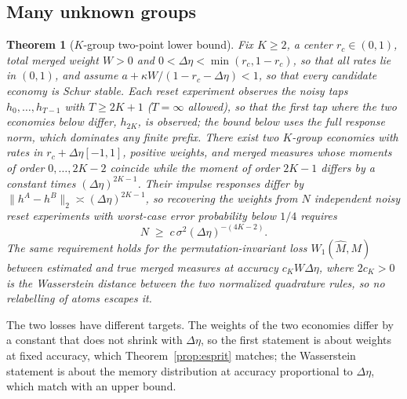 \documentclass[12pt]{article}
\newtheorem{theorem}{Theorem}[section]
\theoremstyle{definition}
\theoremstyle{remark}
\begin{document}
\subsection{Many unknown groups}

\begin{theorem}[$K$-group two-point lower bound]\label{thm:kcohort}
Fix $K\ge2$, a center $r_c\in(0,1)$, total merged weight $W>0$ and $0<\Delta\eta<\min(r_c,1-r_c)$, so that all rates lie in $(0,1)$, and assume $a+\kappa W/(1-r_c-\Delta\eta)<1$, so that every candidate economy is Schur stable. Each reset experiment observes the noisy taps $h_0,\ldots,h_{T-1}$ with $T\ge2K+1$ ($T=\infty$ allowed), so that the first tap where the two economies below differ, $h_{2K}$, is observed; the bound below uses the full response norm, which dominates any finite prefix. There exist two $K$-group economies with rates in $r_c+\Delta\eta[-1,1]$, positive weights, and merged measures whose moments of order $0,\ldots,2K-2$ coincide while the moment of order $2K-1$ differs by a constant times $(\Delta\eta)^{2K-1}$. Their impulse responses differ by $\|h^A-h^B\|_2\asymp(\Delta\eta)^{2K-1}$, so recovering the weights from $N$ independent noisy reset experiments with worst-case error probability below $1/4$ requires
\[
N\;\ge\;c\,\sigma^2(\Delta\eta)^{-(4K-2)} .
\]
The same requirement holds for the permutation-invariant loss $W_1(\hat M,M)$ between estimated and true merged measures at accuracy $c_KW\Delta\eta$, where $2c_K>0$ is the Wasserstein distance between the two normalized quadrature rules, so no relabelling of atoms escapes it.
\end{theorem}

The two losses have different targets. The weights of the two economies differ by a constant that does not shrink with $\Delta\eta$, so the first statement is about weights at fixed accuracy, which Theorem~\ref{prop:esprit} matches; the Wasserstein statement is about the memory distribution at accuracy proportional to $\Delta\eta$, which \citet{niroula2026a} match with an upper bound.
\end{document}
